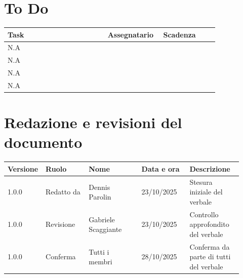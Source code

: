 \documentclass[a4paper,12pt]{article}
\begin{document}
\section{To Do}

\begin{center}
\small
\renewcommand{\arraystretch}{1.2} 
\begin{tabular}{|p{0.45\linewidth}|p{0.25\linewidth}|p{0.25\linewidth}|}
\hline
\rowcolor{gray!60} 
\textbf{Task} & \textbf{Assegnatario} & \textbf{Scadenza} \\
\hline
\rowcolor{white}
N.A &  &  \\
\hline
\rowcolor{gray!20}
N.A &  &  \\
\hline
\rowcolor{white}
N.A &  &  \\
\hline
\rowcolor{gray!20}
N.A &  &  \\
\hline
\end{tabular}
\end{center}

\clearpage
\section{Redazione e revisioni del documento}

\begin{center}
\small
\renewcommand{\arraystretch}{1.2} 
\begin{tabular}{|p{0.1\linewidth}|p{0.18\linewidth}|p{0.22\linewidth}|p{0.20\linewidth}|p{0.22\linewidth}|}
\hline
\rowcolor{gray!60} 
\textbf{Versione} & \textbf{Ruolo} & \textbf{Nome} & \textbf{Data e ora} & \textbf{Descrizione} \\
\hline
\rowcolor{white}
1.0.0 & Redatto da & Dennis Parolin & 23/10/2025 & Stesura iniziale del verbale \\
\hline
\rowcolor{gray!20}
1.0.0 & Revisione & Gabriele Scaggiante & 23/10/2025 & Controllo approfondito del verbale \\
\hline
\rowcolor{white}
1.0.0 & Conferma & Tutti i membri & 28/10/2025 & Conferma da parte di tutti del verbale \\
\hline
\end{tabular}
\end{center}


\end{document}

